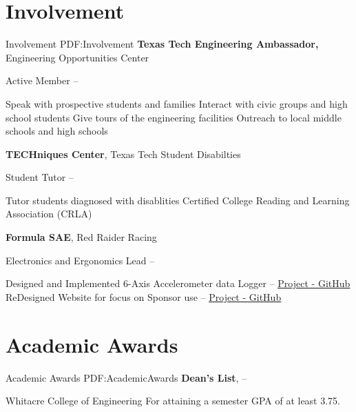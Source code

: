 \documentclass[a4paper,10pt,oneside]{article}
\begin{document}
\begin{body}
\section
{Involvement}
{Involvement}
{PDF:Involvement}
{\textbf{Texas Tech Engineering Ambassador,}  Engineering Opportunities Center}
\par
\Item
Active Member
\hfill
{} --
\begin{detail}
\BulletItem
Speak with prospective students and families 
\BulletItem
Interact with civic groups and high school students
\BulletItem
Give tours of the engineering facilities
\BulletItem
Outreach to local middle schools and high schools
\end{detail}
\SmallEntryGap
{\textbf{TECHniques Center}, Texas Tech Student Disabilties}

\par
\Item
Student Tutor
\hfill
{} --
\begin{detail}
\BulletItem Tutor students diagnosed with disablities
\BulletItem Certified College Reading and Learning Association (CRLA)
\end{detail}
\SmallEntryGap
{\textbf{Formula SAE}, Red Raider Racing}
\par
\Item
Electronics and Ergonomics Lead
\hfill
{} --
\begin{detail}
\BulletItem
Designed and Implemented 6-Axis Accelerometer data Logger -- \href{https://github.com/rahutchinson/FDRM64-6Axis-2-SDCARD}{\underline{Project - GitHub}}
\BulletItem
ReDesigned Website for focus on Sponsor use -- \href{https://github.com/rahutchinson/FSAE_Site}{\underline{Project - GitHub}}
\end{detail}



\section
{Academic Awards}
{Academic Awards}
{PDF:AcademicAwards}
{\textbf{Dean's List}},
\hfill
{} --
\begin{detail}
\Item
Whitacre College of Engineering
\Item
For attaining a semester GPA of at least 3.75.
\end{detail}



\end{body}
\end{document}
